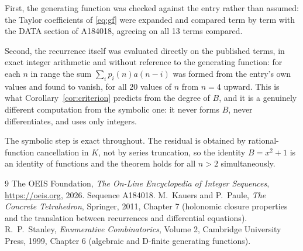 \documentclass[11pt,a4paper]{article}
\theoremstyle{plain}
\theoremstyle{definition}
\begin{document}
First, the generating function was checked against the entry rather than assumed: the
Taylor coefficients of \eqref{eq:gf} were expanded and compared term by term with the DATA
section of A184018, agreeing on all 13 terms compared.

Second, the recurrence itself was evaluated directly on the published terms, in exact
integer arithmetic and without reference to the generating function: for each $n$ in range
the sum $\sum_{i}p_{i}(n)a(n-i)$ was formed from the entry's own values and found to
vanish, for all 20 values of $n$ from $n=4$ upward. This is what
Corollary~\ref{cor:criterion} predicts from the degree of $B$, and it is a genuinely
different computation from the symbolic one: it never forms $B$, never differentiates, and
uses only integers.

The symbolic step is exact throughout. The residual is obtained by rational-function
cancellation in $K$, not by series truncation, so the identity $B=x^{2} + 1$ is an
identity of functions and the theorem holds for all $n>2$ simultaneously.

\begin{thebibliography}{9}
 The OEIS Foundation, \emph{The On-Line Encyclopedia of Integer Sequences},
\url{https://oeis.org}, 2026. Sequence A184018.
 M.~Kauers and P.~Paule, \emph{The Concrete Tetrahedron}, Springer, 2011,
Chapter 7 (holonomic closure properties and the translation between recurrences and
differential equations).
 R.~P.~Stanley, \emph{Enumerative Combinatorics}, Volume 2, Cambridge
University Press, 1999, Chapter 6 (algebraic and D-finite generating functions).
\end{thebibliography}
\end{document}
